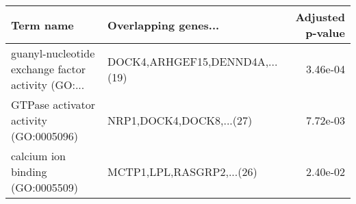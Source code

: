 \begin{tabular}{llr}
\toprule
                                         Term name &           Overlapping genes... &  Adjusted p-value \\
\midrule
guanyl-nucleotide exchange factor activity (GO:... & DOCK4,ARHGEF15,DENND4A,...(19) &          3.46e-04 \\
            GTPase activator activity (GO:0005096) &       NRP1,DOCK4,DOCK8,...(27) &          7.72e-03 \\
                  calcium ion binding (GO:0005509) &      MCTP1,LPL,RASGRP2,...(26) &          2.40e-02 \\
\bottomrule
\end{tabular}
